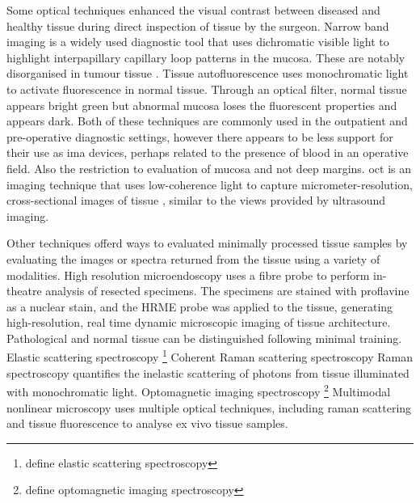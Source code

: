 Some optical techniques enhanced the visual contrast between diseased and healthy tissue during direct inspection of tissue by the surgeon. 
Narrow band imaging \cite{tirelliNarrowBandImaging2015, tirellig.TailoredResectionsOral2018} is a widely used diagnostic tool that uses dichromatic visible light to highlight interpapillary capillary loop patterns in the mucosa. 
These are notably disorganised in tumour tissue \cite{vuEfficacyNarrowBand2014}.
Tissue autofluorescence \cite{ohnishiy.UsefulnessFluorescenceVisualization2016} uses monochromatic light to activate fluorescence in normal tissue.
Through an optical filter, normal tissue appears bright green but abnormal mucosa loses the fluorescent properties and appears dark.
Both of these techniques are commonly used in the outpatient and pre-operative diagnostic settings, however there appears to be less support for their use as \gls{ima} devices, perhaps related to the presence of blood in an operative field. 
Also the restriction to evaluation of mucosa and not deep margins.
\Gls{oct} is an imaging technique that uses low-coherence light to capture micrometer-resolution, cross-sectional images of tissue \cite{hamdoonz.OpticalCoherenceTomography2016, heidaria.e.UseOpticalCoherence2020}, similar to the views provided by ultrasound imaging.

Other techniques offerd ways to evaluated minimally processed tissue samples by evaluating the images or spectra returned from the tissue using a variety of modalities.
High resolution microendoscopy \cite{vilap.m.DiscriminationBenignNeoplastic2012, milesb.a.OperativeMarginControl2015} uses a fibre probe to perform in-theatre analysis of resected specimens.
The specimens are stained with proflavine as a nuclear stain, and the HRME probe was applied to the tissue, generating high-resolution, real time dynamic microscopic imaging of tissue architecture.
Pathological and normal tissue can be distinguished following minimal training.
Elastic scattering spectroscopy \cite{grilloneg.a.ColorCancerMargin2017}\footnote{define elastic scattering spectroscopy}
Coherent Raman scattering spectroscopy \cite{hoeslir.c.CoherentRamanScattering2017} Raman spectroscopy quantifies the inelastic scattering of photons from tissue illuminated with monochromatic light.
Optomagnetic imaging spectroscopy \cite{lisulb.PredictiveValueOptomagnetic2019}\footnote{define optomagnetic imaging spectroscopy} 
Multimodal nonlinear microscopy \cite{heukes.MultimodalNonlinearMicroscopy2016} uses multiple optical techniques, including raman scattering and tissue fluorescence to analyse ex vivo tissue samples.

